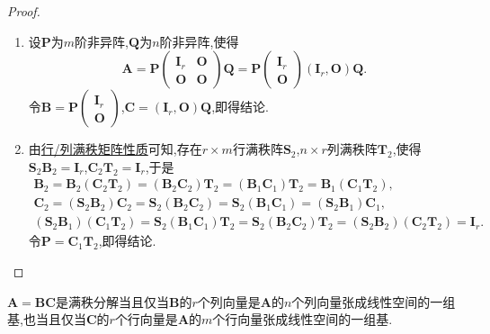 \documentclass[../../main.tex]{subfiles}%
\begin{document}
\begin{proof}
\begin{enumerate}[(1)]
\item 设\(\boldsymbol{P}\)为\(m\)阶非异阵,\(\boldsymbol{Q}\)为\(n\)阶非异阵,使得
\[
\boldsymbol{A}=\boldsymbol{P}\begin{pmatrix}
\boldsymbol{I}_r&\boldsymbol{O}\\
\boldsymbol{O}&\boldsymbol{O}
\end{pmatrix}\boldsymbol{Q}=\boldsymbol{P}\begin{pmatrix}
\boldsymbol{I}_r\\
\boldsymbol{O}
\end{pmatrix}(\boldsymbol{I}_r,\boldsymbol{O})\boldsymbol{Q}.
\]
令\(\boldsymbol{B}=\boldsymbol{P}\begin{pmatrix}
\boldsymbol{I}_r\\
\boldsymbol{O}
\end{pmatrix}\),\(\boldsymbol{C}=(\boldsymbol{I}_r,\boldsymbol{O})\boldsymbol{Q}\),即得结论.

\item  由\hyperref[proposition:行/列满秩矩阵性质]{行/列满秩矩阵性质}可知,存在\(r\times m\)行满秩阵\(\boldsymbol{S}_2\),\(n\times r\)列满秩阵\(\boldsymbol{T}_2\),使得\(\boldsymbol{S}_2\boldsymbol{B}_2=\boldsymbol{I}_r\),\(\boldsymbol{C}_2\boldsymbol{T}_2=\boldsymbol{I}_r\),于是
\begin{gather*}
\boldsymbol{B}_2=\boldsymbol{B}_2(\boldsymbol{C}_2\boldsymbol{T}_2)=(\boldsymbol{B}_2\boldsymbol{C}_2)\boldsymbol{T}_2=(\boldsymbol{B}_1\boldsymbol{C}_1)\boldsymbol{T}_2=\boldsymbol{B}_1(\boldsymbol{C}_1\boldsymbol{T}_2),\\
\boldsymbol{C}_2=(\boldsymbol{S}_2\boldsymbol{B}_2)\boldsymbol{C}_2=\boldsymbol{S}_2(\boldsymbol{B}_2\boldsymbol{C}_2)=\boldsymbol{S}_2(\boldsymbol{B}_1\boldsymbol{C}_1)=(\boldsymbol{S}_2\boldsymbol{B}_1)\boldsymbol{C}_1,\\
(\boldsymbol{S}_2\boldsymbol{B}_1)(\boldsymbol{C}_1\boldsymbol{T}_2)=\boldsymbol{S}_2(\boldsymbol{B}_1\boldsymbol{C}_1)\boldsymbol{T}_2=\boldsymbol{S}_2(\boldsymbol{B}_2\boldsymbol{C}_2)\boldsymbol{T}_2=(\boldsymbol{S}_2\boldsymbol{B}_2)(\boldsymbol{C}_2\boldsymbol{T}_2)=\boldsymbol{I}_r.
\end{gather*}
令\(\boldsymbol{P}=\boldsymbol{C}_1\boldsymbol{T}_2\),即得结论.
\end{enumerate}
\end{proof}

\begin{proposition}\label{proposition:几何观点下的矩阵满秩分解}
\(\boldsymbol{A}=\boldsymbol{B}\boldsymbol{C}\)是满秩分解当且仅当\(\boldsymbol{B}\)的\(r\)个列向量是\(\boldsymbol{A}\)的\(n\)个列向量张成线性空间的一组基,也当且仅当\(\boldsymbol{C}\)的\(r\)个行向量是\(\boldsymbol{A}\)的\(m\)个行向量张成线性空间的一组基.
\end{proposition}
\end{document}
